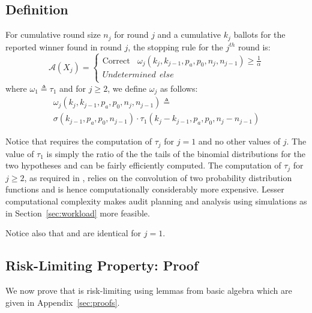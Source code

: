 \subsection{Definition}
\label{sec:prov_def}
\begin{definition}
    \label{def:minervatwo}
    For cumulative round size $n_j$ for round $j$ and a cumulative $k_j$ ballots for the reported winner found in round $j$, the \R \Providence stopping rule for the $j^{th}$ round is:
$$
\mathcal{A}(X_{j})=  \left\{ \begin{array}{ll} \text{Correct} ~~~~ \omega_{j}(k_{j}, k_{j-1}, p_a, p_0, n_j, n_{j-1}) \geq \frac{1}{\alpha}\\
        Undetermined ~~else \\
    \end{array}
    \right .
$$
where $\omega _{1}\triangleq \tau_{1}$ and for $j\ge 2$, we define $\omega _{j}$ as follows:
\begin{equation}
    \begin{aligned}
    \omega_{j}(k_{j}, k_{j-1}, p_a, p_0, n_{j}, n_{j-1})
    \triangleq\\
    \sigma(k_{j-1},p_a,p_0,n_{j-1})\cdot \tau_1(k_{j}-k_{j-1},p_a,p_0,n_j-n_{j-1})
    \end{aligned}
\end{equation}
\end{definition}

Notice that \Providence requires the computation of $\tau_j$ for $j=1$ and no other values of $j$. The value of $\tau_1$ is simply the ratio of the the tails of the binomial distributions for the two hypotheses and can be fairly efficiently computed. The computation of $\tau_j$ for $j \geq 2$, as required in \Minerva, relies on the convolution of two probability distribution functions and is hence computationally considerably more expensive. Lesser computational complexity makes audit planning and analysis using simulations as in Section~\ref{sec:workload} more feasible.

Notice also that \Providence and \Minerva are identical for $j=1$. 

\subsection{Risk-Limiting Property: Proof}
\label{sec:proof}
We now prove that \Providence is risk-limiting using lemmas from basic algebra which are given in Appendix~\ref{sec:proofs}.

